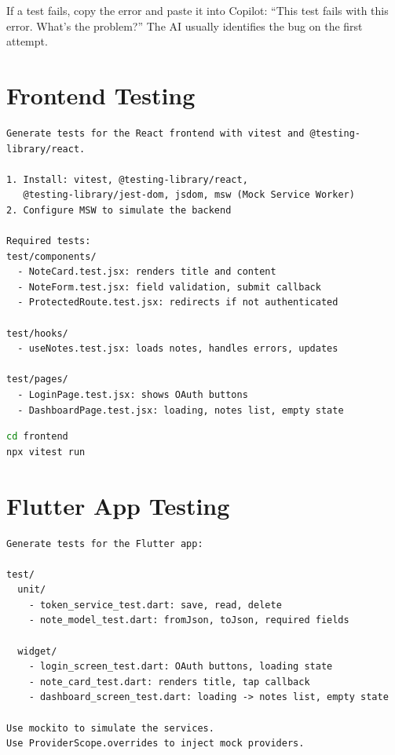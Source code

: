 \begin{tipbox}
If a test fails, copy the error and paste it into Copilot: ``This test fails with this error. What's the problem?'' The AI usually identifies the bug on the first attempt.
\end{tipbox}

\section{Frontend Testing}

\begin{praticabox}[title={Practice --- Generate React tests}]
\begin{lstlisting}[language={}]
Generate tests for the React frontend with vitest and @testing-library/react.

1. Install: vitest, @testing-library/react,
   @testing-library/jest-dom, jsdom, msw (Mock Service Worker)
2. Configure MSW to simulate the backend

Required tests:
test/components/
  - NoteCard.test.jsx: renders title and content
  - NoteForm.test.jsx: field validation, submit callback
  - ProtectedRoute.test.jsx: redirects if not authenticated

test/hooks/
  - useNotes.test.jsx: loads notes, handles errors, updates

test/pages/
  - LoginPage.test.jsx: shows OAuth buttons
  - DashboardPage.test.jsx: loading, notes list, empty state
\end{lstlisting}
\end{praticabox}

\begin{lstlisting}[language=bash]
cd frontend
npx vitest run
\end{lstlisting}

\section{Flutter App Testing}

\begin{praticabox}[title={Practice --- Generate Flutter tests}]
\begin{lstlisting}[language={}]
Generate tests for the Flutter app:

test/
  unit/
    - token_service_test.dart: save, read, delete
    - note_model_test.dart: fromJson, toJson, required fields

  widget/
    - login_screen_test.dart: OAuth buttons, loading state
    - note_card_test.dart: renders title, tap callback
    - dashboard_screen_test.dart: loading -> notes list, empty state

Use mockito to simulate the services.
Use ProviderScope.overrides to inject mock providers.
\end{lstlisting}
\end{praticabox}

